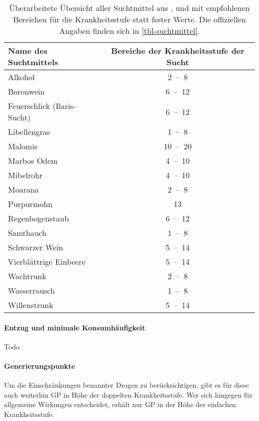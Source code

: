 \begin{table}
	\centering
	\caption[Suchtmittel mit flexiblen Krankheitsstufen]{Überarbeitete Übersicht aller Suchtmittel aus ,  und  mit empfohlenen Bereichen für die Krankheitsstufe statt fester Werte. Die offiziellen Angaben finden sich in \vref{tbl-suchtmittel}.\label{tbl-suchtmittel-revised}}
	\begin{tabular}{lc}
		\toprule
		{Name des Suchtmittels} & {Bereiche der Krankheitsstufe der Sucht} \\
		\hline
		Alkohol & 2~--~8 \\
		Boronwein & 6~--~12 \\
		Feuerschlick (Ilaris-Sucht) & 6~--~12 \\
		Libellengras & 1~--~8 \\
		Malomis & 10~--~20 \\
		Marbos Odem & 4~--~10 \\
		Mibelrohr & 4~--~10 \\
		Moarana & 2~--~8 \\
		Purpurmohn & 13 \\
		Regenbogenstaub & 6~--~12 \\
		Samthauch & 1~--~8 \\
		Schwarzer Wein & 5~--~14 \\
		Vierblättrige Einbeere & 5~--~14 \\
		Wachtrunk & 2~--~8 \\
		Wasserrausch & 1~--~8 \\
		Willenstrunk & 5~--~14 \\
		\bottomrule
	\end{tabular}
\end{table}

\paragraph{Entzug und minimale Konsumhäufigkeit}
Todo.

\paragraph{Generierungspunkte}
Um die Einschränkungen benannter Drogen zu berücksichtigen, gibt es für diese auch weiterhin GP in Höhe der doppelten Krankheitsstufe. Wer sich hingegen für allgemeine Wirkungen entscheidet, erhält nur GP in der Höhe der einfachen Krankheitsstufe.



